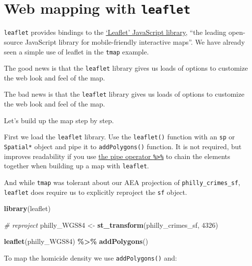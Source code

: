 \documentclass[
]{book}
\newenvironment{Shaded}{\begin{snugshade}}{\end{snugshade}}
\newcommand{\CommentTok}[1]{\textcolor[rgb]{0.56,0.35,0.01}{\textit{#1}}}
\newcommand{\DecValTok}[1]{\textcolor[rgb]{0.00,0.00,0.81}{#1}}
\newcommand{\FunctionTok}[1]{\textcolor[rgb]{0.13,0.29,0.53}{\textbf{#1}}}
\newcommand{\NormalTok}[1]{#1}
\newcommand{\OtherTok}[1]{\textcolor[rgb]{0.56,0.35,0.01}{#1}}
\newcommand{\SpecialCharTok}[1]{\textcolor[rgb]{0.81,0.36,0.00}{\textbf{#1}}}
\begin{document}
\hypertarget{web-mapping-with-leaflet}{%
\section{\texorpdfstring{Web mapping with \texttt{leaflet}}{Web mapping with leaflet}}\label{web-mapping-with-leaflet}}

\texttt{leaflet} provides bindings to the \href{http://leafletjs.com}{`Leaflet' JavaScript library}, ``the leading open-source JavaScript library for mobile-friendly interactive maps''. We have already seen a simple use of leaflet in the \texttt{tmap} example.

The good news is that the \texttt{leaflet} library gives us loads of options to customize the web look and feel of the map.

The bad news is that the \texttt{leaflet} library gives us loads of options to customize the web look and feel of the map.

Let's build up the map step by step.

First we load the \texttt{leaflet} library. Use the \texttt{leaflet()} function with an \texttt{sp} or \texttt{Spatial*} object and pipe it to \texttt{addPolygons()} function. It is not required, but improves readability if you use \href{https://github.com/tidyverse/magrittr}{the pipe operator \texttt{\%\textgreater{}\%}} to chain the elements together when building up a map with \texttt{leaflet}.

And while \texttt{tmap} was tolerant about our AEA projection of \texttt{philly\_crimes\_sf}, \texttt{leaflet} does require us to explicitly reproject the \texttt{sf} object.

\begin{Shaded}
\begin{Highlighting}[]
\FunctionTok{library}\NormalTok{(leaflet) }

\CommentTok{\# reproject}
\NormalTok{philly\_WGS84 }\OtherTok{\textless{}{-}} \FunctionTok{st\_transform}\NormalTok{(philly\_crimes\_sf, }\DecValTok{4326}\NormalTok{)}

\FunctionTok{leaflet}\NormalTok{(philly\_WGS84) }\SpecialCharTok{\%\textgreater{}\%}
  \FunctionTok{addPolygons}\NormalTok{()}
\end{Highlighting}
\end{Shaded}

To map the homicide density we use \texttt{addPolygons()} and:
\end{document}
